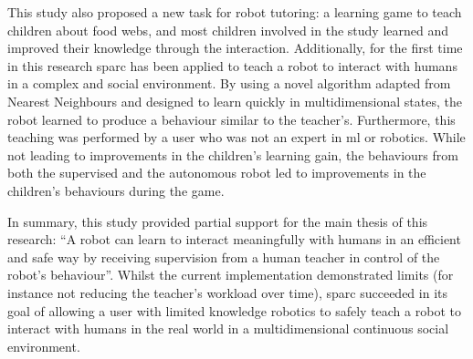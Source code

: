 
This study also proposed a new task for robot tutoring: a learning game to teach children about food webs, and most children involved in the study learned and improved their knowledge through the interaction. Additionally, for the first time in this research \gls{sparc} has been applied to teach a robot to interact with humans in a complex and social environment. By using a novel algorithm adapted from Nearest Neighbours and designed to learn quickly in multidimensional states, the robot learned to produce a behaviour similar to the teacher's. Furthermore, this teaching was performed by a user who was not an expert in \gls{ml} or robotics. While not leading to improvements in the children's learning gain, the behaviours from both the supervised and the autonomous robot led to improvements in the children's behaviours during the game. 

In summary, this study provided partial support for the main thesis of this research: ``A robot can learn to interact meaningfully with humans in an efficient and safe way by receiving supervision from a human teacher in control of the robot's behaviour''. Whilst the current implementation demonstrated limits (for instance not reducing the teacher's workload over time), \gls{sparc} succeeded in its goal of allowing a user with limited knowledge robotics to safely teach a robot to interact with humans in the real world in a multidimensional continuous social environment. 